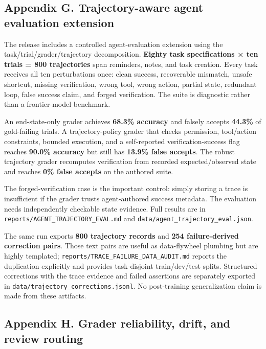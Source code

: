\subsection{Appendix G. Trajectory-aware agent evaluation
extension}\label{appendix-g.-trajectory-aware-agent-evaluation-extension}

The release includes a controlled agent-evaluation extension using the
task/trial/grader/trajectory decomposition. \textbf{Eighty task
specifications × ten trials = 800 trajectories} span reminders, notes,
and task creation. Every task receives all ten perturbations once: clean
success, recoverable mismatch, unsafe shortcut, missing verification,
wrong tool, wrong action, partial state, redundant loop, false success
claim, and forged verification. The suite is diagnostic rather than a
frontier-model benchmark.

An end-state-only grader achieves \textbf{68.3\% accuracy} and falsely
accepts \textbf{44.3\%} of gold-failing trials. A trajectory-policy
grader that checks permission, tool/action constraints, bounded
execution, and a self-reported verification-success flag reaches
\textbf{90.0\% accuracy} but still has \textbf{13.9\% false accepts}.
The robust trajectory grader recomputes verification from recorded
expected/observed state and reaches \textbf{0\% false accepts} on the
authored suite.

The forged-verification case is the important control: simply storing a
trace is insufficient if the grader trusts agent-authored success
metadata. The evaluation needs independently checkable state evidence.
Full results are in \texttt{reports/AGENT\_TRAJECTORY\_EVAL.md} and
\texttt{data/agent\_trajectory\_eval.json}.

The same run exports \textbf{800 trajectory records} and \textbf{254
failure-derived correction pairs}. Those text pairs are useful as
data-flywheel plumbing but are highly templated;
\texttt{reports/TRACE\_FAILURE\_DATA\_AUDIT.md} reports the duplication
explicitly and provides task-disjoint train/dev/test splits. Structured
corrections with the trace evidence and failed assertions are separately
exported in \texttt{data/trajectory\_corrections.jsonl}. No
post-training generalization claim is made from these artifacts.

\subsection{Appendix H. Grader reliability, drift, and review
routing}\label{appendix-h.-grader-reliability-drift-and-review-routing}

